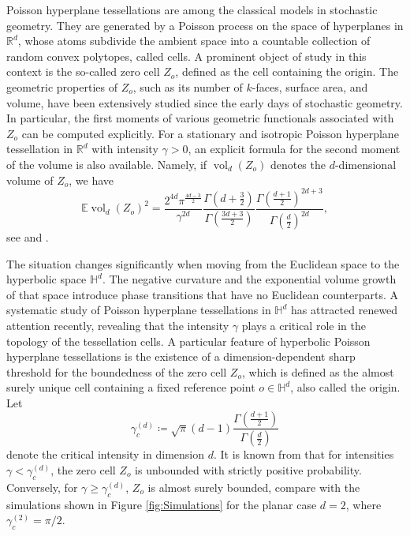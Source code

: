 \documentclass[11pt,a4paper]{article}
\theoremstyle{plain}
\theoremstyle{definition}
\theoremstyle{remark}
\newcommand{\vol}{\mathop{\mathrm{vol}}\nolimits}
\def\EE{\mathbb{E}}
\def\HH{\mathbb{H}}
\def\RR{\mathbb{R}}
\begin{document}
Poisson hyperplane tessellations are among the classical models in stochastic geometry. They are generated by a Poisson process on the space of hyperplanes in $\mathbb{R}^d$, whose atoms subdivide the ambient space into a countable collection of random convex polytopes, called cells. A prominent object of study in this context is the so-called zero cell $Z_o$, defined as the cell containing the origin. The geometric properties of $Z_o$, such as its number of $k$-faces, surface area, and volume, have been extensively studied since the early days of stochastic geometry. In particular, the first moments of various geometric functionals associated with $Z_o$ can be computed explicitly. For a stationary and isotropic Poisson hyperplane tessellation in $\RR^d$ with intensity $\gamma>0$, an explicit formula for the second moment of the volume is also available. Namely, if $\vol_d(Z_o)$ denotes the $d$-dimensional volume of $Z_o$, we have
\begin{equation}\label{eq:SecondMomentEuclidean}
    \EE\vol_d(Z_o)^2 = \frac{2^{4d} \pi^{\frac{4d-3}{2}}}{\gamma^{2d}} \frac{\Gamma\left(d+\frac{3}{2}\right)}{\Gamma\left(\frac{3d+3}{2}\right)} \frac{\Gamma\left(\frac{d+1}{2}\right)^{2d+3}}{\Gamma\left(\frac{d}{2}\right)^{2d}},
\end{equation}
see \cite[pages 178--179]{Matheron} and \cite[Theorem 16.7.1]{HS}. 


The situation changes significantly when moving from the Euclidean space to the hyperbolic space $\mathbb{H}^d$. The negative curvature and the exponential volume growth of that space introduce phase transitions that have no Euclidean counterparts. A systematic study of Poisson hyperplane tessellations in $\mathbb{H}^d$ has attracted renewed attention recently, revealing that the intensity $\gamma$ plays a critical role in the topology of the tessellation cells. A particular feature of hyperbolic Poisson hyperplane tessellations is the existence of a dimension-dependent sharp threshold for the boundedness of the zero cell $Z_o$, which is defined as the almost surely unique cell containing a fixed reference point $o\in\HH^d$, also called the origin. Let
\begin{equation}\label{eq:CriticalIntensity}
	\gamma_c^{(d)} \coloneqq \sqrt{\pi}(d-1) \frac{\Gamma(\frac{d+1}{2})}{\Gamma(\frac{d}{2})}
\end{equation}
denote the critical intensity in dimension $d$. It is known from \cite{BuehlerGusakovaRecke,GodlandKabluchkoThaeleBetaStar,PorretBlanc} that for intensities $\gamma < \gamma_c^{(d)}$, the zero cell $Z_o$ is unbounded with strictly positive probability. Conversely, for $\gamma \geq \gamma_c^{(d)}$, $Z_o$ is almost surely bounded, compare with the simulations shown in Figure \ref{fig:Simulations} for the planar case $d=2$, where $\gamma_c^{(2)} = \pi/2$.
\end{document}
